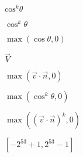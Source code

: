 \documentclass{article}
\begin{document}
$ \mbox{cos}^k \theta $
\pagebreak

$ \cos^k \theta $
\pagebreak

$\max(\cos \theta,0)$
\pagebreak

$\vec{V}$
\pagebreak

$\max(\vec{v} \cdot \vec{n}, 0)$
\pagebreak

$\max(\cos^k \theta,0)$
\pagebreak

$\max((\vec{v} \cdot \vec{n})^k, 0)$
\pagebreak

$[-2^{53}+1, 2^{53}-1]$
\pagebreak
\end{document}
